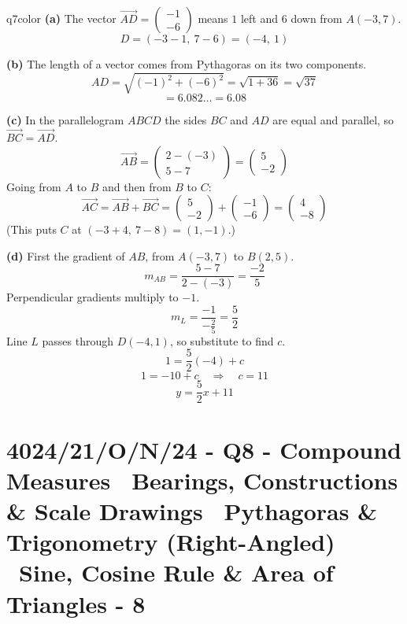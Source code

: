 \documentclass[11pt,a4paper]{article}
\newcommand{\examq}[4]{\section[#1 - Q#2]{#1 - Q#2 - #3 - #4}}
\begin{document}
\begin{ansbox}{q7color}
\textbf{(a)} The vector $\overrightarrow{AD} = \begin{pmatrix} -1 \\ -6 \end{pmatrix}$ means $1$ left and $6$ down from $A(-3, 7)$.
\[ D = (-3 - 1,\ 7 - 6) = (-4,\ 1) \]

\textbf{(b)} The length of a vector comes from Pythagoras on its two components.
\[ AD = \sqrt{(-1)^2 + (-6)^2} = \sqrt{1 + 36} = \sqrt{37} \]
\[ = 6.082\ldots = 6.08 \]

\textbf{(c)} In the parallelogram $ABCD$ the sides $BC$ and $AD$ are equal and parallel, so $\overrightarrow{BC} = \overrightarrow{AD}$.
\[ \overrightarrow{AB} = \begin{pmatrix} 2 - (-3) \\ 5 - 7 \end{pmatrix} = \begin{pmatrix} 5 \\ -2 \end{pmatrix} \]
Going from $A$ to $B$ and then from $B$ to $C$:
\[ \overrightarrow{AC} = \overrightarrow{AB} + \overrightarrow{BC} = \begin{pmatrix} 5 \\ -2 \end{pmatrix} + \begin{pmatrix} -1 \\ -6 \end{pmatrix} = \begin{pmatrix} 4 \\ -8 \end{pmatrix} \]
(This puts $C$ at $(-3 + 4,\ 7 - 8) = (1, -1)$.)

\textbf{(d)} First the gradient of $AB$, from $A(-3, 7)$ to $B(2, 5)$.
\[ m_{AB} = \frac{5 - 7}{2 - (-3)} = \frac{-2}{5} \]
Perpendicular gradients multiply to $-1$.
\[ m_{L} = \frac{-1}{-\frac{2}{5}} = \frac{5}{2} \]
Line $L$ passes through $D(-4, 1)$, so substitute to find $c$.
\[ 1 = \frac{5}{2}(-4) + c \]
\[ 1 = -10 + c \quad \Rightarrow \quad c = 11 \]
\[ y = \frac{5}{2}x + 11 \]
\end{ansbox}

\examq{4024/21/O/N/24}{8}{Compound Measures \textperiodcentered\ Bearings, Constructions \& Scale Drawings \textperiodcentered\ Pythagoras \& Trigonometry (Right-Angled) \textperiodcentered\ Sine, Cosine Rule \& Area of Triangles}{8}
\end{document}
